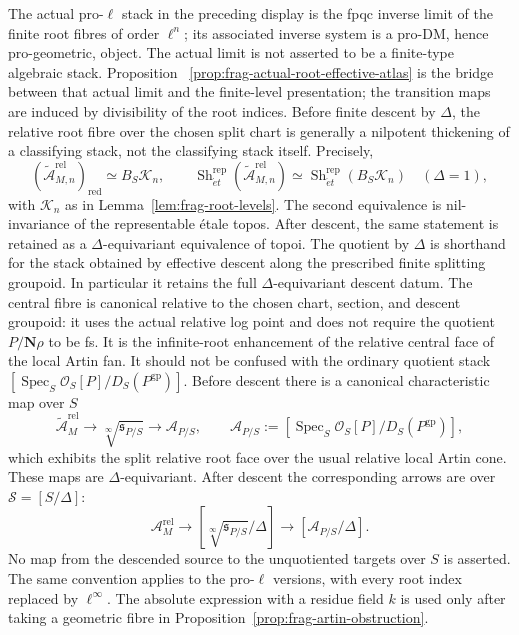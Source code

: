 \documentclass[11pt]{article}
\theoremstyle{definition}
\theoremstyle{remark}
\begin{document}
The actual pro-$\ell$ stack in the preceding display is the fpqc inverse limit
of the finite root fibres of order $\ell^n$; its associated inverse system is
a pro-DM, hence pro-geometric, object.  The actual limit is not asserted to be
a finite-type algebraic stack.  Proposition~
\ref{prop:frag-actual-root-effective-atlas} is the bridge between that actual
limit and the finite-level presentation; the transition maps are induced by
divisibility of the root indices.
Before finite descent by $\Delta$, the relative root fibre over the chosen
split chart is generally a nilpotent thickening of a classifying stack, not the
classifying stack itself.  Precisely,
\begin{equation}
 (\widetilde{\mathcal A}_{M,n}^{\mathrm{rel}})_{\mathrm{red}}
 \simeq B_S\mathcal K_n,
 \qquad
 \operatorname{Sh}_{\acute et}^{\mathrm{rep}}
   (\widetilde{\mathcal A}_{M,n}^{\mathrm{rel}})
 \simeq
 \operatorname{Sh}_{\acute et}^{\mathrm{rep}}(B_S\mathcal K_n)
 \quad(\Delta=1),
 \label{eq:frag-root-reduction-BK}
\end{equation}
with $\mathcal K_n$ as in Lemma~\ref{lem:frag-root-levels}.  The second
equivalence is
nil-invariance of the representable \'{e}tale topos.  After descent, the same
statement is retained as a $\Delta$-equivariant equivalence of topoi.
The quotient by $\Delta$ is shorthand for the stack obtained by effective
descent along the prescribed finite splitting groupoid.  In particular it
retains the full $\Delta$-equivariant descent datum.  The central fibre is canonical relative to the chosen chart,
section, and descent groupoid: it uses the actual relative log point and does
not require the quotient
$P/\mathbf N\rho$ to be fs.  It is the infinite-root enhancement of the
relative central face of the local Artin fan.  It should not be confused with
the ordinary quotient stack
$[\operatorname{Spec}_S\mathcal O_S[P]/D_S(P^{\mathrm{gp}})]$.
Before descent there is a canonical characteristic map over $S$
\[
 \widetilde{\mathcal A}_M^{\mathrm{rel}}
 \longrightarrow \sqrt[\infty]{\mathfrak s_{P/S}}
 \longrightarrow \mathcal A_{P/S},
 \qquad
 \mathcal A_{P/S}:=
 [\operatorname{Spec}_S\mathcal O_S[P]/D_S(P^{\mathrm{gp}})],
\]
which exhibits the split relative root face over the usual relative
local Artin cone.  These maps are $\Delta$-equivariant.  After descent
the corresponding arrows are over $\mathscr S=[S/\Delta]$:
\[
 \mathcal A_M^{\mathrm{rel}}
 \longrightarrow[\sqrt[\infty]{\mathfrak s_{P/S}}/\Delta]
 \longrightarrow[\mathcal A_{P/S}/\Delta].
\]
No map from the descended source to the unquotiented targets over $S$
is asserted.  The same convention applies to the pro-$\ell$ versions,
with every root index replaced by $\ell^\infty$.
The absolute expression with a residue
field $k$ is used only after taking a geometric fibre in
Proposition~\ref{prop:frag-artin-obstruction}.
\end{document}
